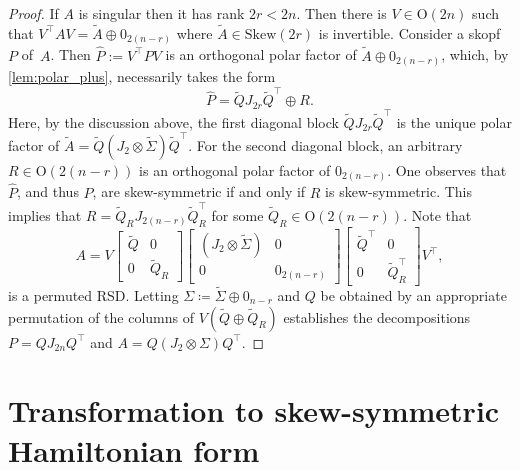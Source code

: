 \documentclass[final,onefignum,onetabnum,dvipsnames]{siamart251216}
\numberwithin{algorithm}{section}
\numberwithin{equation}{section}
\begin{document}
\begin{proof}
    If $A$ is singular then it has rank $2r< 2n$. Then there is $V\in\mathrm{O}(2n)$ such that $V^\top A V = \widetilde{A} \oplus 0_{2(n-r)}$ where $\widetilde{A}\in\mathrm{Skew}(2r)$ is invertible. Consider a skopf $P$ of~$A$. Then $\widehat{P}:= V^\top P V$ is an orthogonal polar factor of
    $\widetilde{A} \oplus 0_{2(n-r)}$, which, by \cref{lem:polar_plus}, necessarily takes the form
    \[\widehat{P} = \widetilde{Q}J_{2r}\widetilde{Q}^\top \oplus R.\]
    Here, by the discussion above, the first diagonal block
    $\widetilde{Q}J_{2r}\widetilde{Q}^\top$ is the unique polar factor of $\widetilde{A} = \widetilde{Q} (J_2 \otimes \widetilde{\Sigma})\widetilde{Q}^\top$. For the second diagonal block, an arbitrary $R\in\mathrm{O}(2(n-r))$ is an orthogonal polar factor of $0_{2(n-r)}$. One observes that $\widehat{P}$, and thus $P$, are skew-symmetric if and only if $R$ is skew-symmetric. This implies that $R = \widetilde{Q}_RJ_{2(n-r)}\widetilde{Q}_R^\top$ for some $\widetilde{Q}_R\in\mathrm{O}(2(n-r))$. Note that
    \begin{equation*}
        A = V \begin{bmatrix}
            \widetilde{Q}&0\\
            0&\widetilde{Q}_R
        \end{bmatrix} \begin{bmatrix}
            (J_2\otimes \widetilde{\Sigma})&0\\
            0&0_{2(n-r)}
        \end{bmatrix}  \begin{bmatrix}
            \widetilde{Q}^\top&0\\
            0&\widetilde{Q}_R^\top 
        \end{bmatrix} V^\top  ,  
    \end{equation*}
    is a permuted RSD. 
    Letting $\Sigma \coloneq \widetilde{\Sigma} \oplus 0_{n-r}$ and $Q$ be obtained by an appropriate permutation of the columns of $V
    (\widetilde{Q}\oplus \widetilde{Q}_R)$ establishes the decompositions $P=QJ_{2n}Q^\top$ and $A = Q(J_2 \otimes \Sigma)Q^\top$.
\end{proof}

\section{Transformation to skew-symmetric Hamiltonian form}\label{sec:hamiltonian_reduction}
\end{document}
